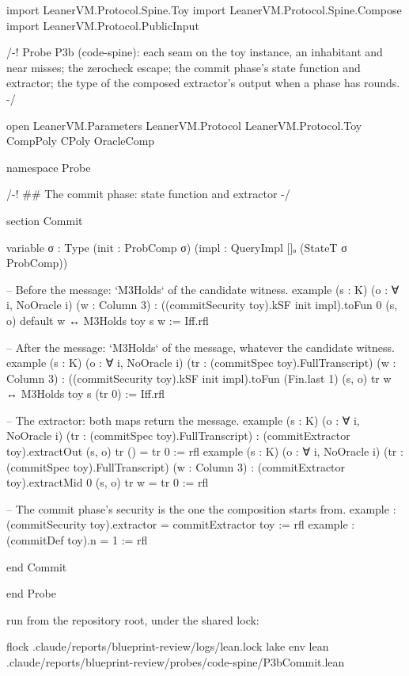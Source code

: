 \begin{leancode}
import LeanerVM.Protocol.Spine.Toy
import LeanerVM.Protocol.Spine.Compose
import LeanerVM.Protocol.PublicInput

/-!
Probe P3b (code-spine): each seam on the toy instance, an inhabitant and near misses; the
zerocheck escape; the commit phase's state function and extractor; the type of the composed
extractor's output when a phase has rounds.
-/

open LeanerVM.Parameters LeanerVM.Protocol LeanerVM.Protocol.Toy CompPoly CPoly OracleComp

namespace Probe

/-! ## The commit phase: state function and extractor -/

section Commit

variable {σ : Type} (init : ProbComp σ) (impl : QueryImpl []ₒ (StateT σ ProbComp))

-- Before the message: `M3Holds` of the candidate witness.
example (s : K) (o : ∀ i, NoOracle i) (w : Column 3) :
    ((commitSecurity toy).kSF init impl).toFun 0 (s, o) default w ↔ M3Holds toy s w := Iff.rfl

-- After the message: `M3Holds` of the message, whatever the candidate witness.
example (s : K) (o : ∀ i, NoOracle i) (tr : (commitSpec toy).FullTranscript) (w : Column 3) :
    ((commitSecurity toy).kSF init impl).toFun (Fin.last 1) (s, o) tr w ↔
      M3Holds toy s (tr 0) := Iff.rfl

-- The extractor: both maps return the message.
example (s : K) (o : ∀ i, NoOracle i) (tr : (commitSpec toy).FullTranscript) :
    (commitExtractor toy).extractOut (s, o) tr () = tr 0 := rfl
example (s : K) (o : ∀ i, NoOracle i) (tr : (commitSpec toy).FullTranscript) (w : Column 3) :
    (commitExtractor toy).extractMid 0 (s, o) tr w = tr 0 := rfl

-- The commit phase's security is the one the composition starts from.
example : (commitSecurity toy).extractor = commitExtractor toy := rfl
example : (commitDef toy).n = 1 := rfl

end Commit

end Probe
\end{leancode}

run from the repository root, under the shared lock:

\begin{shellcode}
flock .claude/reports/blueprint-review/logs/lean.lock lake env lean .claude/reports/blueprint-review/probes/code-spine/P3bCommit.lean
\end{shellcode}

